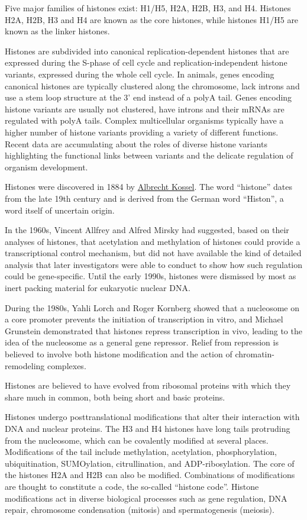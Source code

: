 Five major families of histones exist: H1/H5, H2A, H2B, H3, and H4. Histones H2A, H2B, H3 and H4 are known as the core histones, while histones H1/H5 are known as the linker histones.

Histones are subdivided into canonical replication-dependent histones that are expressed during the S-phase of cell cycle and replication-independent histone variants, expressed during the whole cell cycle. In animals, genes encoding canonical histones are typically clustered along the chromosome, lack introns and use a stem loop structure at the 3' end instead of a polyA tail. Genes encoding histone variants are usually not clustered, have introns and their mRNAs are regulated with polyA tails. Complex multicellular organisms typically have a higher number of histone variants providing a variety of different functions. Recent data are accumulating about the roles of diverse histone variants highlighting the functional links between variants and the delicate regulation of organism development.

Histones were discovered in 1884 by \href{https://en.wikipedia.org/wiki/Albrecht_Kossel}{Albrecht Kossel}. The word ``histone'' dates from the late 19th century and is derived from the German word ``Histon'', a word itself of uncertain origin.

In the 1960s, Vincent Allfrey and Alfred Mirsky had suggested, based on their analyses of histones, that acetylation and methylation of histones could provide a transcriptional control mechanism, but did not have available the kind of detailed analysis that later investigators were able to conduct to show how such regulation could be gene-specific. Until the early 1990s, histones were dismissed by most as inert packing material for eukaryotic nuclear DNA.

During the 1980s, Yahli Lorch and Roger Kornberg showed that a nucleosome on a core promoter prevents the initiation of transcription in vitro, and Michael Grunstein demonstrated that histones repress transcription in vivo, leading to the idea of the nucleosome as a general gene repressor. Relief from repression is believed to involve both histone modification and the action of chromatin-remodeling complexes.

Histones are believed to have evolved from ribosomal proteins with which they share much in common, both being short and basic proteins.

Histones undergo posttranslational modifications that alter their interaction with DNA and nuclear proteins. The H3 and H4 histones have long tails protruding from the nucleosome, which can be covalently modified at several places. Modifications of the tail include methylation, acetylation, phosphorylation, ubiquitination, SUMOylation, citrullination, and ADP-ribosylation. The core of the histones H2A and H2B can also be modified. Combinations of modifications are thought to constitute a code, the so-called ``histone code''. Histone modifications act in diverse biological processes such as gene regulation, DNA repair, chromosome condensation (mitosis) and spermatogenesis (meiosis).

